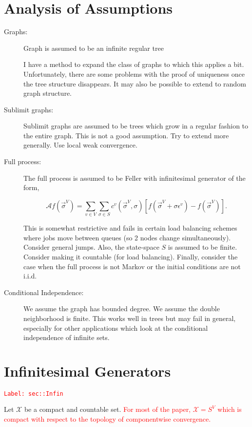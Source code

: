 \documentclass[12pt]{article}
\newcommand{\mc}{\mathcal}
\newcommand{\ep}{\epsilon}
\newcommand{\tr}{\textcolor{red}}
\newcommand{\labe}[1]{\tr{\texttt{Label: #1}}}
\renewcommand{\v}{v}							%
\renewcommand{\S}{S}							%
\newcommand{\s}{\sigma}							%
\newcommand{\sv}{\vec{\s}}						%
\newcommand{\ev}{\ep}							%
\newcommand{\IG}{\mc{A}}						%
\newcommand{\IGr}{c}							%
\newcommand{\vind}[1]{^{#1}}					%
\newcommand{\carp}[1]{^{#1}}					%
\newcommand{\vsi}[1]{^{#1}}						%
\newcommand{\cind}[1]{_{#1}}					%
\newcommand{\spce}{\mc{X}}						%
\begin{document}
\section{Analysis of Assumptions}

\begin{description}
\item[Graphs: ] Graph is assumed to be an infinite regular tree

I have a method to expand the class of graphs to which this applies a bit. Unfortunately, there are some problems with the proof of uniqueness once the tree structure disappears. It may also be possible to extend to random graph structure.

\item[Sublimit graphs: ] Sublimit graphs are assumed to be trees which grow in a regular fashion to the entire graph. This is not a good assumption. Try to extend more generally. Use local weak convergence.

\item[Full process: ] The full process is assumed to be Feller with infinitesimal generator of the form,

\[\IG f(\sv\cind{}\vsi{V}) = \sum_{\v \in V}\sum_{\s \in \S} \IGr\vind{\v}(\sv\cind{}\vsi{V},\s)[f(\sv\cind{}\vsi{V} + \s \ev\vind{\v}) - f(\sv\cind{}\vsi{V})].\]

This is somewhat restrictive and fails in certain load balancing schemes where jobs move between queues (so 2 nodes change simultaneously). Consider general jumps. Also, the state-space \(\S\) is assumed to be finite. Consider making it countable (for load balancing). Finally, consider the case when the full process is not Markov or the initial conditions are not i.i.d.

\item[Conditional Independence: ] We assume the graph has bounded degree. We assume the double neighborhood is finite. This works well in trees but may fail in general, especially for other applications which look at the conditional independence of infinite sets.
\end{description}

\newpage
\appendix

\section{Infinitesimal Generators}
\label{sec::Infin}\labe{sec::Infin}

Let \(\spce\) be a compact and countable set. \tr{For most of the paper, \(\spce = \S\carp{V}\) which is compact with respect to the topology of componentwise convergence.}
\end{document}
